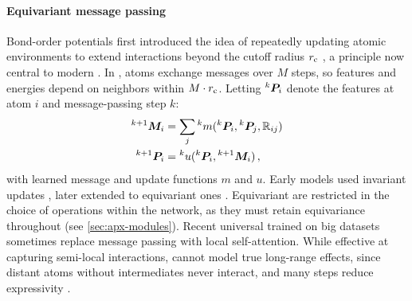 \documentclass[10pt]{article} %
\begin{document}
\paragraph{Equivariant message passing}
Bond-order potentials first introduced the idea of repeatedly updating atomic environments to extend interactions beyond the cutoff radius $r_{\text{c}}$ \citep{t1988,b1990}, a principle now central to modern \mlps. In \mpnns \citep{gsrvd2017}, atoms exchange messages over $M$ steps, so features and energies depend on neighbors within $M \cdot r_{\text{c}}$. Letting ${}^k{\bm{P}}_i$ denote the features at atom $i$ and message-passing step $k$:
\begin{align}
    {}^{k+1}{\bm{M}}_{i} &= \sum_j {}^{k}m({}^k{\bm{P}}_i, {}^k{\bm{P}}_j, \mathbb{R}_{ij})  \label{eq:message} \\
    {}^{k+1}{\bm{P}}_i &= {}^{k}u({}^k{\bm{P}}_i, {}^{k+1}{\bm{M}}_i) \, , \label{eq:update}
\end{align}
with learned message and update functions $m$ and $u$.
Early models used invariant updates \citep{sksctm2017,xg2018}, later extended to equivariant ones \citep{ggg2019,sug2021,bksoc2022,bmsgmkmsk2022,fumc2024}.
Equivariant \mpnns are restricted in the choice of operations within the network, as they must retain equivariance throughout (see \cref{sec:apx-modules}).
Recent universal \mlps trained on big datasets \citep{bbcwzc2025,wdfgsbagklmscdrsuz2025,mbkptfplc2025pre,rvsggdn2025} sometimes replace message passing with local self-attention. While effective at capturing semi-local interactions, \mpnns cannot model true long-range effects, since distant atoms without intermediates never interact, and many steps reduce expressivity \citep{cw2020,ay2020,npfc2022}.
\end{document}
